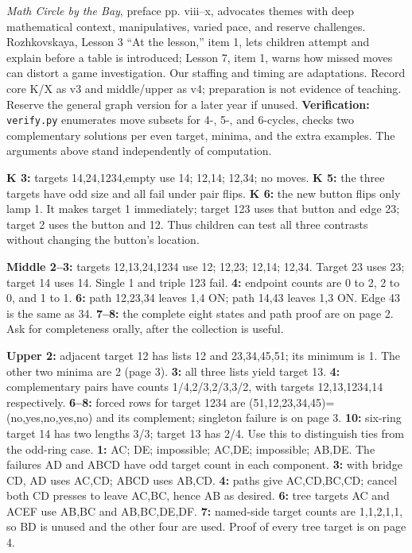 \documentclass[12pt]{extarticle}
\begin{document}
\emph{Math Circle by the Bay}, preface pp. viii--x, advocates themes with deep mathematical context, manipulatives, varied pace, and reserve challenges. Rozhkovskaya, Lesson 3 ``At the lesson,'' item 1, lets children attempt and explain before a table is introduced; Lesson 7, item 1, warns how missed moves can distort a game investigation. Our staffing and timing are adaptations. Record core K/X as v3 and middle/upper as v4; preparation is not evidence of teaching. Reserve the general graph version for a later year if unused.
\textbf{Verification:} \texttt{verify.py} enumerates move subsets for 4-, 5-, and 6-cycles, checks two complementary solutions per even target, minima, and the extra examples. The arguments above stand independently of computation.

\newpage
{}
\textbf{K 3:} targets 14,24,1234,empty use 14; 12,14; 12,34; no moves. \textbf{K 5:} the three targets have odd size and all fail under pair flips. \textbf{K 6:} the new button flips only lamp 1. It makes target 1 immediately; target 123 uses that button and edge 23; target 2 uses the button and 12. Thus children can test all three contrasts without changing the button's location.\par
\textbf{Middle 2--3:} targets 12,13,24,1234 use 12; 12,23; 12,14; 12,34. Target 23 uses 23; target 14 uses 14. Single 1 and triple 123 fail. \textbf{4:} endpoint counts are 0 to 2, 2 to 0, and 1 to 1. \textbf{6:} path 12,23,34 leaves 1,4 ON; path 14,43 leaves 1,3 ON. Edge 43 is the same as 34. \textbf{7--8:} the complete eight states and path proof are on page 2. Ask for completeness orally, after the collection is useful.\par
\textbf{Upper 2:} adjacent target 12 has lists 12 and 23,34,45,51; its minimum is 1. The other two minima are 2 (page 3). \textbf{3:} all three lists yield target 13. \textbf{4:} complementary pairs have counts 1/4,2/3,2/3,3/2, with targets 12,13,1234,14 respectively. \textbf{6--8:} forced rows for target 1234 are (51,12,23,34,45)=(no,yes,no,yes,no) and its complement; singleton failure is on page 3. \textbf{10:} six-ring target 14 has two lengths 3/3; target 13 has 2/4. Use this to distinguish ties from the odd-ring case.
\textbf{1:} AC; DE; impossible; AC,DE; impossible; AB,DE. The failures AD and ABCD have odd target count in each component. \textbf{3:} with bridge CD, AD uses AC,CD; ABCD uses AB,CD. \textbf{4:} paths give AC,CD,BC,CD; cancel both CD presses to leave AC,BC, hence AB as desired. \textbf{6:} tree targets AC and ACEF use AB,BC and AB,BC,DE,DF. \textbf{7:} named-side target counts are 1,1,2,1,1, so BD is unused and the other four are used. Proof of every tree target is on page 4.
\end{document}
